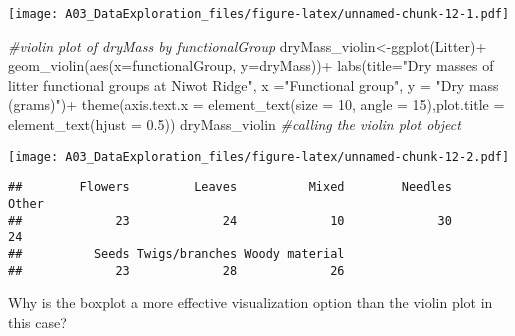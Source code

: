 \documentclass[
]{article}
\newenvironment{Shaded}{\begin{snugshade}}{\end{snugshade}}
\newcommand{\AttributeTok}[1]{\textcolor[rgb]{0.77,0.63,0.00}{#1}}
\newcommand{\CommentTok}[1]{\textcolor[rgb]{0.56,0.35,0.01}{\textit{#1}}}
\newcommand{\DecValTok}[1]{\textcolor[rgb]{0.00,0.00,0.81}{#1}}
\newcommand{\FloatTok}[1]{\textcolor[rgb]{0.00,0.00,0.81}{#1}}
\newcommand{\FunctionTok}[1]{\textcolor[rgb]{0.00,0.00,0.00}{#1}}
\newcommand{\NormalTok}[1]{#1}
\newcommand{\OtherTok}[1]{\textcolor[rgb]{0.56,0.35,0.01}{#1}}
\newcommand{\SpecialCharTok}[1]{\textcolor[rgb]{0.00,0.00,0.00}{#1}}
\newcommand{\StringTok}[1]{\textcolor[rgb]{0.31,0.60,0.02}{#1}}
\begin{document}
\texttt{[image: A03\_DataExploration\_files/figure-latex/unnamed-chunk-12-1.pdf]}

\begin{Shaded}
\begin{Highlighting}[]
\CommentTok{\#violin plot of dryMass by functionalGroup}
\NormalTok{dryMass\_violin}\OtherTok{\textless{}{-}}\FunctionTok{ggplot}\NormalTok{(Litter)}\SpecialCharTok{+}
  \FunctionTok{geom\_violin}\NormalTok{(}\FunctionTok{aes}\NormalTok{(}\AttributeTok{x=}\NormalTok{functionalGroup, }\AttributeTok{y=}\NormalTok{dryMass))}\SpecialCharTok{+}
  \FunctionTok{labs}\NormalTok{(}\AttributeTok{title=}\StringTok{"Dry masses of litter functional groups at Niwot Ridge"}\NormalTok{,}
  \AttributeTok{x =}\StringTok{"Functional group"}\NormalTok{, }\AttributeTok{y =} \StringTok{"Dry mass (grams)"}\NormalTok{)}\SpecialCharTok{+}
  \FunctionTok{theme}\NormalTok{(}\AttributeTok{axis.text.x =} \FunctionTok{element\_text}\NormalTok{(}\AttributeTok{size =} \DecValTok{10}\NormalTok{, }\AttributeTok{angle =} \DecValTok{15}\NormalTok{),}\AttributeTok{plot.title =} \FunctionTok{element\_text}\NormalTok{(}\AttributeTok{hjust =} \FloatTok{0.5}\NormalTok{)) }
\NormalTok{dryMass\_violin }\CommentTok{\#calling the violin plot object}
\end{Highlighting}
\end{Shaded}

\texttt{[image: A03\_DataExploration\_files/figure-latex/unnamed-chunk-12-2.pdf]}

\begin{Shaded}
\end{Shaded}

\begin{verbatim}
##        Flowers         Leaves          Mixed        Needles          Other 
##             23             24             10             30             24 
##          Seeds Twigs/branches Woody material 
##             23             28             26
\end{verbatim}

Why is the boxplot a more effective visualization option than the violin
plot in this case?
\end{document}
